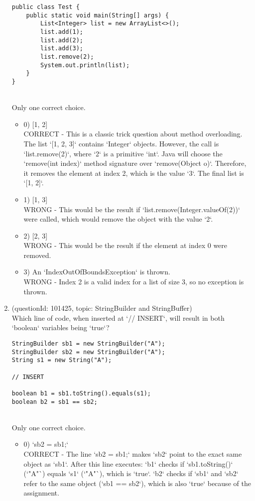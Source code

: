 \documentclass[12pt]{article}
\begin{document}
\begin{enumerate}[label=(\arabic*)]
\begin{verbatim}
public class Test {
    public static void main(String[] args) {
        List<Integer> list = new ArrayList<>();
        list.add(1);
        list.add(2);
        list.add(3);
        list.remove(2);
        System.out.println(list);
    }
}
\end{verbatim}
\\ \noindent Only one correct choice. 
\begin{itemize}
\item 0) [1, 2]
 \\ 
CORRECT - This is a classic trick question about method overloading. The list `[1, 2, 3]` contains `Integer` objects. However, the call is `list.remove(2)`, where `2` is a primitive `int`. Java will choose the `remove(int index)` method signature over `remove(Object o)`. Therefore, it removes the element at index 2, which is the value `3`. The final list is `[1, 2]`.

\item 1) [1, 3]
 \\ 
WRONG - This would be the result if `list.remove(Integer.valueOf(2))` were called, which would remove the object with the value `2`.

\item 2) [2, 3]
 \\ 
WRONG - This would be the result if the element at index 0 were removed.

\item 3) An `IndexOutOfBoundsException` is thrown.
 \\ 
WRONG - Index 2 is a valid index for a list of size 3, so no exception is thrown.

\end{itemize}
\item (questionId: 101425, topic: StringBuilder and StringBuffer) \\ 
Which line of code, when inserted at `// INSERT`, will result in both `boolean` variables being `true`?
\begin{verbatim}
StringBuilder sb1 = new StringBuilder("A");
StringBuilder sb2 = new StringBuilder("A");
String s1 = new String("A");

// INSERT

boolean b1 = sb1.toString().equals(s1);
boolean b2 = sb1 == sb2;
\end{verbatim}
\\ \noindent Only one correct choice. 
\begin{itemize}
\item 0) `sb2 = sb1;`
 \\ 
CORRECT - The line `sb2 = sb1;` makes `sb2` point to the exact same object as `sb1`. After this line executes: `b1` checks if `sb1.toString()` (`"A"`) equals `s1` (`"A"`), which is `true`. `b2` checks if `sb1` and `sb2` refer to the same object (`sb1 == sb2`), which is also `true` because of the assignment.


\end{itemize}
\end{enumerate}
\end{document}

